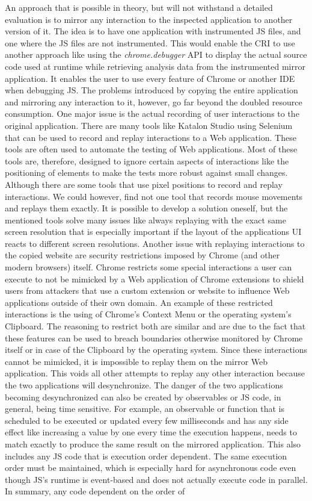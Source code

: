 An approach that is possible in theory, but will not withstand a detailed evaluation is to mirror any interaction to the inspected application to another version of it. The idea is to have one application with instrumented JS files, and one where the JS files are not instrumented. This would enable the CRI to use another approach like using the \emph{chrome.debugger} API to display the actual source code used at runtime while retrieving analysis data from the instrumented mirror application. It enables the user to use every feature of Chrome or another IDE when debugging JS. The problems introduced by copying the entire application and mirroring any interaction to it, however, go far beyond the doubled resource consumption. One major issue is the actual recording of user interactions to the original application. There are many tools like Katalon Studio \cite{Katalon} using Selenium \cite{Selenium} that can be used to record and replay interactions to a Web application. These tools are often used to automate the testing of Web applications. Most of these tools are, therefore, designed to ignore certain aspects of interactions like the positioning of elements to make the tests more robust against small changes. Although there are some tools that use pixel positions to record and replay interactions. We could however, find not one tool that records mouse movements and replays them exactly. It is possible to develop a solution oneself, but the mentioned tools solve many issues like always replaying with the exact same screen resolution that is especially important if the layout of the applications UI reacts to different screen resolutions. Another issue with replaying interactions to the copied website are security restrictions imposed by Chrome (and other modern browsers) itself. Chrome restricts some special interactions a user can execute to not be mimicked by a Web application of Chrome extensions to shield users from attackers that use a custom extension or website to influence Web applications outside of their own domain. An example of these restricted interactions is the using of Chrome's Context Menu or the operating system's Clipboard. The reasoning to restrict both are similar and are due to the fact that these features can be used to breach boundaries otherwise monitored by Chrome itself or in case of the Clipboard by the operating system. Since these interactions cannot be mimicked, it is impossible to replay them on the mirror Web application. This voids all other attempts to replay any other interaction because the two applications will desynchronize. The danger of the two applications becoming desynchronized can also be created by observables or JS code, in general, being time sensitive. For example, an observable or function that is scheduled to be executed or updated every few milliseconds and has any side effect like increasing a value by one every time the execution happens, needs to match exactly to produce the same result on the mirrored application. This also includes any JS code that is execution order dependent. The same execution order must be maintained, which is especially hard for asynchronous code even though JS's runtime is event-based \cite{EventBasedJS} and does not actually execute code in parallel. In summary, any code dependent on the order of 